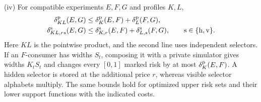 \begin{theorem}
\smallskip\noindent
\textup{(iv)} For compatible experiments $E,F,G$ and profiles $K,L$,
\begin{align}
 \delta^{\rm p}_{KL}(E,G)&\le\delta^{\rm p}_K(E,F)+\delta^{\rm p}_L(F,G),\label{eq:v13-triangle}\\
 \delta^{\rm s}_{KL,rs}(E,G)&\le
 \delta^{\rm s}_{K,r}(E,F)+\delta^{\rm s}_{L,s}(F,G),
                       \qquad {\rm s}\in\{{\rm h},{\rm v}\}.
                       \nonumber
\end{align}
Here $KL$ is the pointwise product, and the second line uses independent
selectors. If an $F$-consumer has widths $S_t$, composing it with a
private simulator gives widths $K_tS_t$ and changes every $[0,1]$ marked
risk by at most $\delta^{\rm p}_K(E,F)$. A hidden selector is stored at the
additional price $r$, whereas visible selector alphabets multiply.
The same bounds hold for optimized upper risk sets and their lower
support functions with the indicated costs.
\end{theorem}


